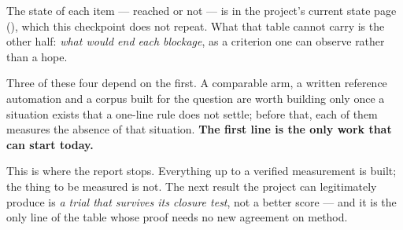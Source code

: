 The state of each item --- reached or not --- is in the project's current state
page (), which this checkpoint does not repeat. What
that table cannot carry is the other half: \emph{what would end each blockage}, as
a criterion one can observe rather than a hope.



Three of these four depend on the first. A comparable arm, a written reference
automation and a corpus built for the question are worth building only once a
situation exists that a one-line rule does not settle; before that, each of them
measures the absence of that situation. \textbf{The first line is the only work that
can start today.}

This is where the report stops. Everything up to a verified measurement is built;
the thing to be measured is not. The next result the project can legitimately
produce is \emph{a trial that survives its closure test}, not a better score ---
and it is the only line of the table whose proof needs no new agreement on method.

\clearpage
